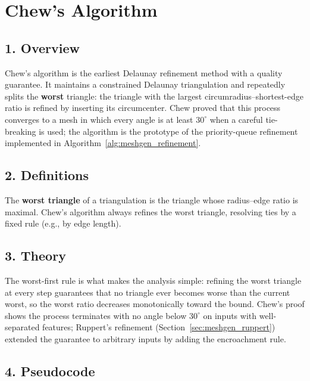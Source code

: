 \section{Chew's Algorithm}
\label{sec:meshgen_chew}

\subsection{1. Overview}

Chew's algorithm \cite{chew1989} is the earliest Delaunay refinement method
with a quality guarantee. It maintains a constrained Delaunay triangulation
and repeatedly splits the \textbf{worst} triangle: the triangle with the
largest circumradius--shortest-edge ratio is refined by inserting its
circumcenter. Chew proved that this process converges to a mesh in which
every angle is at least $30^\circ$ when a careful tie-breaking is used; the
algorithm is the prototype of the priority-queue refinement implemented in
Algorithm~\ref{alg:meshgen_refinement}.

\subsection{2. Definitions}

\begin{definition}\label{def:meshgen_worst}
  The \textbf{worst triangle} of a triangulation is the triangle whose
  radius--edge ratio is maximal. Chew's algorithm always refines the worst
  triangle, resolving ties by a fixed rule (e.g., by edge length).
\end{definition}

\subsection{3. Theory}

The worst-first rule is what makes the analysis simple: refining the
worst triangle at every step guarantees that no triangle ever becomes worse
than the current worst, so the worst ratio decreases monotonically toward
the bound. Chew's proof shows the process terminates with no angle below
$30^\circ$ on inputs with well-separated features; Ruppert's refinement
(Section~\ref{sec:meshgen_ruppert}) extended the guarantee to arbitrary
inputs by adding the encroachment rule.

\subsection{4. Pseudocode}

